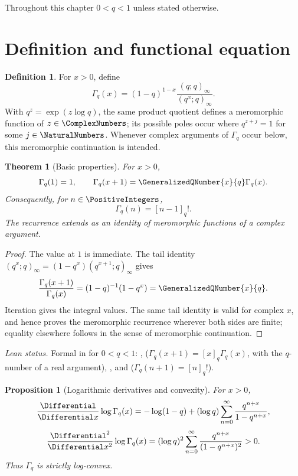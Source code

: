 \documentclass[11pt,a4paper,oneside,openany]{book}
\newtheorem{theorem}{Theorem}[chapter]
\newtheorem{proposition}[proposition]{Proposition}
\theoremstyle{definition}
\newtheorem{definition}[definition]{Definition}
\theoremstyle{remark}
\begin{document}
Throughout this chapter $0<q<1$ unless stated otherwise.

\section{Definition and functional equation}

\begin{definition}
For $x>0$, define
\[
 \Gamma_q(x)
 =(1-q)^{1-x}\frac{(q;q)_\infty}{(q^x;q)_\infty}.
\]
With $q^z=\exp(z\log q)$, the same product quotient defines a
meromorphic function of $z\in\ComplexNumbers$; its possible poles occur where
$q^{z+j}=1$ for some $j\in\NaturalNumbers$.  Whenever complex arguments of
$\Gamma_q$ occur below, this meromorphic continuation is intended.
\end{definition}

\begin{theorem}[Basic properties]\label{thm:qgamma-basic}
For $x>0$,
\[
 \Gamma_q(1)=1,
 \qquad
 \Gamma_q(x+1)=\GeneralizedQNumber{x}{q}\Gamma_q(x).
\]
Consequently, for $n\in\PositiveIntegers$,
\[
 \Gamma_q(n)=[n-1]_q!.
\]
The recurrence extends as an identity of meromorphic functions of a
complex argument.
\end{theorem}

\begin{proof}
The value at $1$ is immediate.  The tail identity
\(
 (q^x;q)_\infty=(1-q^x)(q^{x+1};q)_\infty
\)
gives
\[
 \frac{\Gamma_q(x+1)}{\Gamma_q(x)}
 =(1-q)^{-1}(1-q^x)=\GeneralizedQNumber{x}{q}.
\]
Iteration gives the integral values.  The same tail identity is valid for
complex $x$, and hence proves the meromorphic recurrence wherever both
sides are finite; equality elsewhere follows in the sense of
meromorphic continuation.
\end{proof}

\emph{Lean status.}  Formal in  for $0<q<1$: ,
 ($\Gamma_q(x+1)=[x]_q\Gamma_q(x)$, with
 the $q$-number of a real argument), , and
 ($\Gamma_q(n+1)=[n]_q!$).


\begin{proposition}[Logarithmic derivatives and convexity]\label{prop:qgamma-convex}
For $x>0$,
\[
 \frac{\Differential}{\Differential x}\log\Gamma_q(x)
 =-\log(1-q)+(\log q)\sum_{n=0}^{\infty}
 \frac{q^{n+x}}{1-q^{n+x}},
\]
\[
 \frac{\Differential^2}{\Differential x^2}\log\Gamma_q(x)
 = (\log q)^2\sum_{n=0}^{\infty}
 \frac{q^{n+x}}{(1-q^{n+x})^2}>0.
\]
Thus $\Gamma_q$ is strictly log-convex.
\end{proposition}
\end{document}
